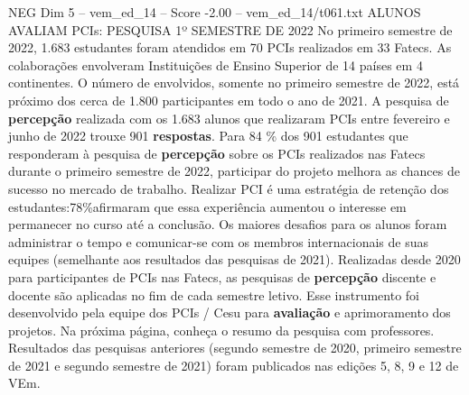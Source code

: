 \begin{textsample}{NEG Dim 5 – vem\_ed\_14 – Score -2.00 – vem\_ed\_14/t061.txt}  \label{ex:f5_neg_012}
ALUNOS AVALIAM PCIs: PESQUISA 1º SEMESTRE DE 2022 No primeiro semestre de 2022, 1.683 estudantes foram atendidos em 70 PCIs realizados em 33 Fatecs.
As colaborações envolveram Instituições de Ensino Superior de 14 países em 4 continentes.
O número de envolvidos, somente no primeiro semestre de 2022, está próximo dos cerca de 1.800 participantes em todo o ano de 2021.
A pesquisa de \textbf{percepção} realizada com os 1.683 alunos que realizaram PCIs entre fevereiro e junho de 2022 trouxe 901 \textbf{respostas}.
Para 84 \% dos 901 estudantes que responderam à pesquisa de \textbf{percepção} sobre os PCIs realizados nas Fatecs durante o primeiro semestre de 2022, participar do projeto melhora as chances de sucesso no mercado de trabalho.
Realizar PCI é uma estratégia de retenção dos estudantes:78\%afirmaram que essa experiência aumentou o interesse em permanecer no curso até a conclusão.
Os maiores desafios para os alunos foram administrar o tempo e comunicar-se com os membros internacionais de suas equipes (semelhante aos resultados das pesquisas de 2021).
Realizadas desde 2020 para participantes de PCIs nas Fatecs, as pesquisas de \textbf{percepção} discente e docente são aplicadas no fim de cada semestre letivo.
Esse instrumento foi desenvolvido pela equipe dos PCIs / Cesu para \textbf{avaliação} e aprimoramento dos projetos.
Na próxima página, conheça o resumo da pesquisa com professores.
Resultados das pesquisas anteriores (segundo semestre de 2020, primeiro semestre de 2021 e segundo semestre de 2021) foram publicados nas edições 5, 8, 9 e 12 de VEm.

\end{textsample}
